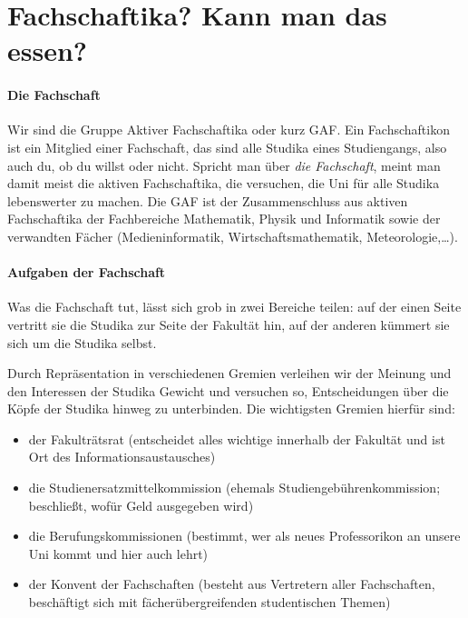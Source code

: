 \section{Fachschaftika? Kann man das essen?}

\paragraph{Die Fachschaft}

Wir sind die Gruppe Aktiver Fachschaftika oder kurz GAF. Ein Fachschaftikon ist ein Mitglied einer Fachschaft, das sind alle Studika eines Studiengangs, also auch du, ob du willst oder nicht. Spricht man über \emph{die Fachschaft}, meint man damit meist die aktiven Fachschaftika, die versuchen, die Uni für alle Studika lebenswerter zu machen. Die GAF ist der Zusammenschluss aus aktiven Fachschaftika der Fachbereiche Mathematik, Physik und Informatik sowie der verwandten Fächer (Medieninformatik, Wirtschaftsmathematik, Meteorologie,\ldots).

\paragraph{Aufgaben der Fachschaft}

Was die Fachschaft tut, lässt sich grob in zwei Bereiche teilen: auf der einen Seite vertritt sie die Studika zur Seite der Fakultät hin, auf der anderen kümmert sie sich um die Studika selbst.

Durch Repräsentation in verschiedenen Gremien verleihen wir der Meinung und den Interessen der Studika Gewicht und versuchen so, Entscheidungen über die Köpfe der Studika hinweg zu unterbinden. Die wichtigsten Gremien hierfür sind:
\begin{itemize}
\item der Fakulträtsrat (entscheidet alles wichtige innerhalb der Fakultät und ist Ort des Informationsaustausches)
\item die Studienersatzmittelkommission (ehemals Studiengebührenkommission; beschließt, wofür Geld ausgegeben wird)
\item die Berufungskommissionen (bestimmt, wer als neues Professorikon an unsere Uni kommt und hier auch lehrt)
\item der Konvent der Fachschaften (besteht aus Vertretern aller Fachschaften, beschäftigt sich mit fächerübergreifenden studentischen Themen)
\end{itemize}

